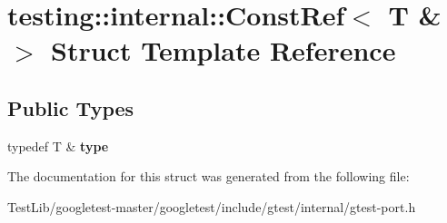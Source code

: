 \hypertarget{structtesting_1_1internal_1_1ConstRef_3_01T_01_6_01_4}{}\section{testing\+:\+:internal\+:\+:Const\+Ref$<$ T \& $>$ Struct Template Reference}
\label{structtesting_1_1internal_1_1ConstRef_3_01T_01_6_01_4}
\subsection*{Public Types}
\begin{DoxyCompactItemize}
\item 
\mbox{\label{structtesting_1_1internal_1_1ConstRef_3_01T_01_6_01_4_a9f664dd25649a0d260cfb1f610c7a349}} 
typedef T \& {\bfseries type}
\end{DoxyCompactItemize}


The documentation for this struct was generated from the following file\+:\begin{DoxyCompactItemize}
\item 
Test\+Lib/googletest-\/master/googletest/include/gtest/internal/gtest-\/port.\+h\end{DoxyCompactItemize}
